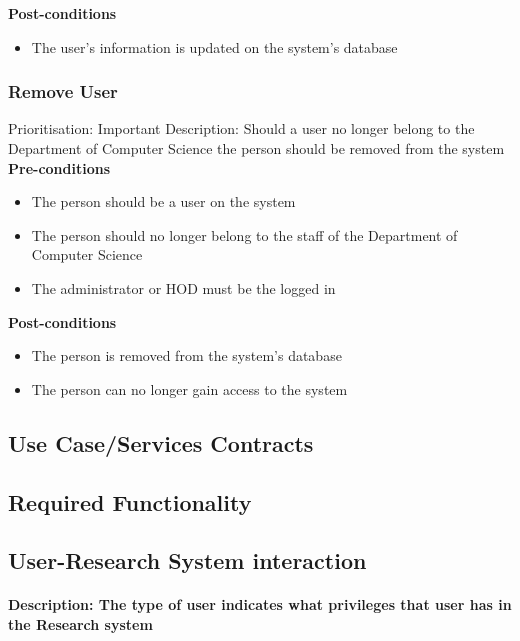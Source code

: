 \documentclass[a4paper]{article}
\begin{document}
    \textbf{Post-conditions}
    \begin{itemize}
        \item The user's information is updated on the system's database
    \end{itemize}
    
    \subsubsection{Remove User}
    Prioritisation: Important
    Description: Should a user no longer belong to the Department of Computer Science the person should be removed from the system\\
    
    \textbf{Pre-conditions}
     \begin{itemize}
        \item The person should be a user on the system
        \item The person should no longer belong to the staff of the Department of Computer Science
        \item The administrator or HOD must be the logged in
   \end{itemize}
    
    \textbf{Post-conditions}
    \begin{itemize}
        \item The person is removed from the system's database
        \item The person can no longer gain access to the system
    \end{itemize}
	\subsection{Use Case/Services Contracts}
	
	\subsection{Required Functionality}
	\subsection{User-Research System interaction}
	\paragraph{\textbf{Description:} The type of user indicates what privileges that user has in the Research system}
\end{document}
